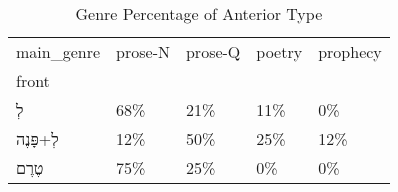 \begin{table}[htbp!]
\centering
\caption{Genre Percentage of Anterior Type}
\label{table:antgenre_pc}
\begin{tabular}{lllll}
\toprule
main\_genre & prose-N & prose-Q & poetry & prophecy \\
front     &         &         &        &          \\
\midrule
לְ        &     68\% &     21\% &    11\% &       0\% \\
לְ+פָּנֶה &     12\% &     50\% &    25\% &      12\% \\
טֶרֶם     &     75\% &     25\% &     0\% &       0\% \\
\bottomrule
\end{tabular}
\end{table}

